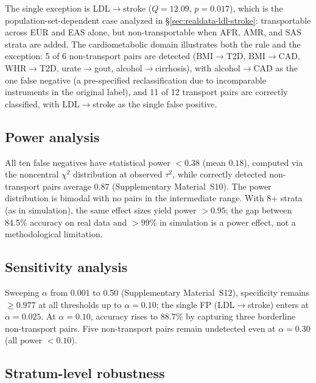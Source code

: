 \documentclass[11pt]{article}
\begin{document}
The single exception is LDL$\to$stroke ($Q = 12.09$, $p = 0.017$), which is the population-set-dependent case analyzed in \S\ref{sec:realdata-ldl-stroke}: transportable across EUR and EAS alone, but non-transportable when AFR, AMR, and SAS strata are added.
The cardiometabolic domain illustrates both the rule and the exception: 5 of 6 non-transport pairs are detected (BMI$\to$T2D, BMI$\to$CAD, WHR$\to$T2D, urate$\to$gout, alcohol$\to$cirrhosis), with alcohol$\to$CAD as the one false negative (a pre-specified reclassification due to incomparable instruments in the original label), and 11 of 12 transport pairs are correctly classified, with LDL$\to$stroke as the single false positive.

\subsection{Power analysis}
\label{sec:realdata-power}

All ten false negatives have statistical power $< 0.38$ (mean $0.18$), computed via the noncentral $\chi^2$ distribution at observed $\tau^2$, while correctly detected non-transport pairs average $0.87$ (Supplementary Material~S10). The power distribution is bimodal with no pairs in the intermediate range. With 8+ strata (as in simulation), the same effect sizes yield power $> 0.95$; the gap between 84.5\% accuracy on real data and $> 99\%$ in simulation is a power effect, not a methodological limitation.

\subsection{Sensitivity analysis}
\label{sec:realdata-sensitivity}

Sweeping $\alpha$ from 0.001 to 0.50 (Supplementary Material~S12), specificity remains $\geq 0.977$ at all thresholds up to $\alpha = 0.10$; the single FP (LDL$\to$stroke) enters at $\alpha = 0.025$. At $\alpha = 0.10$, accuracy rises to 88.7\% by capturing three borderline non-transport pairs. Five non-transport pairs remain undetected even at $\alpha = 0.30$ (all power $< 0.10$).

\subsection{Stratum-level robustness}
\label{sec:realdata-stratum-robustness}
\end{document}

